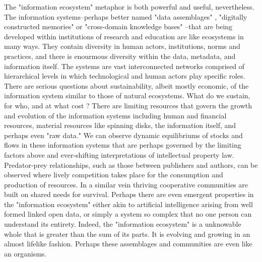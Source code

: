 The "information ecosystem" metaphor is both powerful and useful, nevertheless. The information systems--perhaps better named "data assemblages" \cite{kitchin_2014}, "digitally constructed memories" or "cross-domain knowledge bases" \cite{baker_2007}--that are being developed within institutions of research and education are like ecosystems in many ways. They contain diversity in human actors, institutions, norms and practices, and there is enourmous diversity within the data, metadata, and information itself. The systems are vast interconnected networks comprised of hierarchical levels in which technological and human actors play specific roles. There are serious questions about sustainability, albeit mostly economic, of the information system similar to those of natural ecosystems. What do we sustain, for who, and at what cost \cite[cf.][especially ch. 10]{liverman_2004, kitchin_2014}? There are limiting resources that govern the growth and evolution of the information systems including human and financial resources, material resources like spinning disks, the information itself, and perhaps even "raw data." We can observe dynamic equilibriums of stocks and flows in these information systems that are perhaps governed by the limiting factors above and ever-shifting interpretations of intellectual property law. Predator-prey relationships, such as those between publishers and authors, can be observed where lively competition takes place for the consumption and production of resources. In a similar vein thriving cooperative communities are built on shared needs for survival. Perhaps there are even emergent properties in the "information ecosystem" either akin to artificial intelligence arising from well formed linked open data, or simply a system so complex that no one person can understand its entirety. Indeed, the "information ecosystem" is a unknowable whole that is greater than the sum of its parts. It is evolving and growing in an almost lifelike fashion. Perhaps these assemblages and communities are even like an organisms.

